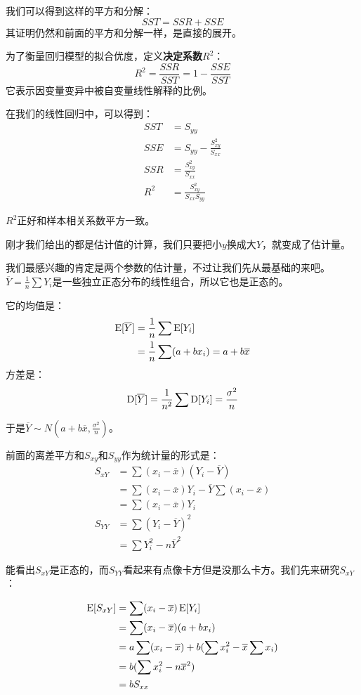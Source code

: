 我们可以得到这样的平方和分解：
\[
SST=SSR+SSE
\]
其证明仍然和前面的平方和分解一样，是直接的展开。

为了衡量回归模型的拟合优度，定义\textbf{决定系数}$R^2$：
\[
R^2=\frac{SSR}{SST}=1-\frac{SSE}{SST}
\]
它表示因变量变异中被自变量线性解释的比例。

在我们的线性回归中，可以得到：
\begin{align*}
SST&=S_{yy}\\
SSE&=S_{yy} - \frac{S_{xy}^2}{S_{xx}}\\
SSR&=\frac{S_{xy}^2}{S_{xx}}\\
R^2&=\frac{S_{xy}^2}{S_{xx}S_{yy}}
\end{align*}

$R^2$正好和样本相关系数平方一致。

刚才我们给出的都是估计值的计算，我们只要把小$y$换成大$Y$，就变成了估计量。

我们最感兴趣的肯定是两个参数的估计量，不过让我们先从最基础的来吧。$\overline{Y}=\frac{1}{n}\sum Y_i$是一些独立正态分布的线性组合，所以它也是正态的。

它的均值是：
\begin{align*}
\operatorname{E}[\overline{Y}]&=\frac{1}{n}\sum \operatorname{E}[Y_i]\\
&= \frac{1}{n}\sum (a+bx_i)=a+b\overline{x}
\end{align*}
方差是：
\[
\operatorname{D}[\overline{Y}] = \frac{1}{n^2}\sum \operatorname{D}[Y_i]= \frac{\sigma^2}{n}
\]

于是$\overline{Y}\sim N(a+b\overline{x},\frac{\sigma^2}{n})$。

前面的离差平方和$S_{xy}$和$S_{yy}$作为统计量的形式是：
\begin{align*}
S_{xY} &= \sum (x_i-\overline{x})(Y_i-\overline{Y})\\
&= \sum (x_i-\overline{x})Y_i-\overline{Y}\sum (x_i-\overline{x})\\
&= \sum (x_i-\overline{x})Y_i\\
S_{YY} &= \sum (Y_i-\overline{Y})^2\\
&= \sum Y_i^2-n\overline{Y}^2
\end{align*}

能看出$S_{xY}$是正态的，而$S_{YY}$看起来有点像卡方但是没那么卡方。我们先来研究$S_{xY}$：

\begin{align*}
\operatorname{E}[S_{xY}] &= \sum (x_i-\overline{x})\operatorname{E}[Y_i]\\
&= \sum (x_i-\overline{x})(a+bx_i)\\
&= a\sum(x_i-\overline{x}) +b(\sum x_i^2-\overline{x}\sum x_i)\\
&= b(\sum x_i^2-n\overline{x}^2)\\
&= bS_{xx}
\end{align*}

